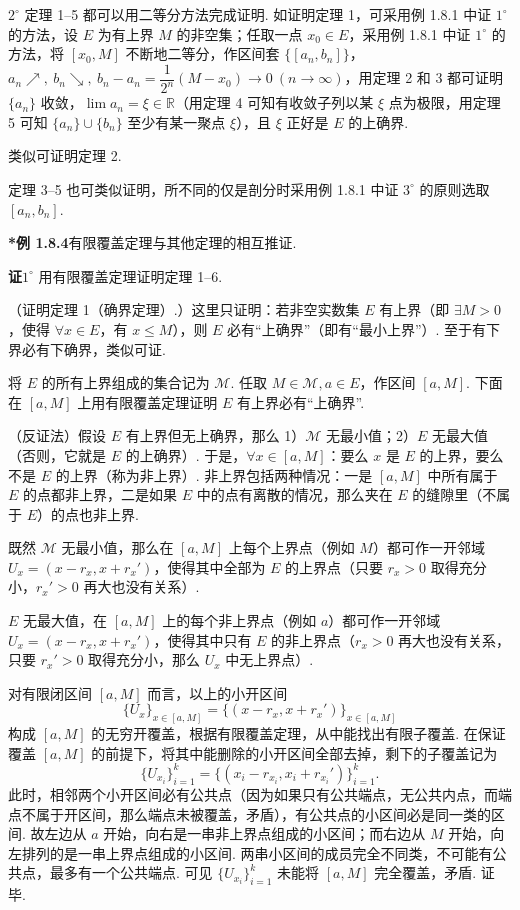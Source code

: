 \documentclass[UTF8, 12pt, fontset=fandol, oneside]{ctexart}
\begin{document}
$2^\circ$ 定理 1--5 都可以用二等分方法完成证明. 如证明定理 1，可采用例 1.8.1 中证 $1^\circ$ 的方法，设 $E$ 为有上界 $M$ 的非空集；任取一点 $x_0\in E$，采用例 1.8.1 中证 $1^\circ$ 的方法，将 $[x_0,M]$ 不断地二等分，作区间套 $\{[a_n,b_n]\}$，$a_n\nearrow,\ b_n\searrow,\ b_n-a_n=\dfrac1{2^n}(M-x_0)\to0\ (n\to\infty)$，用定理 2 和 3 都可证明 $\{a_n\}$ 收敛，$\lim a_n=\xi\in\mathbb{R}$（用定理 4 可知有收敛子列以某 $\xi$ 点为极限，用定理 5 可知 $\{a_n\}\cup\{b_n\}$ 至少有某一聚点 $\xi$），且 $\xi$ 正好是 $E$ 的上确界.

类似可证明定理 2.

定理 3--5 也可类似证明，所不同的仅是剖分时采用例 1.8.1 中证 $3^\circ$ 的原则选取 $[a_n,b_n]$.

\noindent\textbf{*例 1.8.4}\quad 有限覆盖定理与其他定理的相互推证.

\noindent\textbf{证}\quad $1^\circ$ 用有限覆盖定理证明定理 1--6.

（证明定理 1（确界定理）.）这里只证明：若非空实数集 $E$ 有上界（即 $\exists M>0$，使得 $\forall x\in E$，有 $x\le M$），则 $E$ 必有“上确界”（即有“最小上界”）. 至于有下界必有下确界，类似可证.

将 $E$ 的所有上界组成的集合记为 $\mathcal{M}$. 任取 $M\in\mathcal{M},a\in E$，作区间 $[a,M]$. 下面在 $[a,M]$ 上用有限覆盖定理证明 $E$ 有上界必有“上确界”.

（反证法）假设 $E$ 有上界但无上确界，那么 1）$\mathcal{M}$ 无最小值；2）$E$ 无最大值（否则，它就是 $E$ 的上确界）. 于是，$\forall x\in[a,M]$：要么 $x$ 是 $E$ 的上界，要么不是 $E$ 的上界（称为非上界）. 非上界包括两种情况：一是 $[a,M]$ 中所有属于 $E$ 的点都非上界，二是如果 $E$ 中的点有离散的情况，那么夹在 $E$ 的缝隙里（不属于 $E$）的点也非上界.

既然 $\mathcal{M}$ 无最小值，那么在 $[a,M]$ 上每个上界点（例如 $M$）都可作一开邻域 $U_x=(x-r_x,x+r_x')$，使得其中全部为 $E$ 的上界点（只要 $r_x>0$ 取得充分小，$r_x'>0$ 再大也没有关系）.

$E$ 无最大值，在 $[a,M]$ 上的每个非上界点（例如 $a$）都可作一开邻域 $U_x=(x-r_x,x+r_x')$，使得其中只有 $E$ 的非上界点（$r_x>0$ 再大也没有关系，只要 $r_x'>0$ 取得充分小，那么 $U_x$ 中无上界点）.

对有限闭区间 $[a,M]$ 而言，以上的小开区间
\[
  \{U_x\}_{x\in[a,M]}=\{(x-r_x,x+r_x')\}_{x\in[a,M]}
\]
构成 $[a,M]$ 的无穷开覆盖，根据有限覆盖定理，从中能找出有限子覆盖. 在保证覆盖 $[a,M]$ 的前提下，将其中能删除的小开区间全部去掉，剩下的子覆盖记为
\[
  \{U_{x_i}\}_{i=1}^k=\{(x_i-r_{x_i},x_i+r_{x_i}')\}_{i=1}^k.
\]
此时，相邻两个小开区间必有公共点（因为如果只有公共端点，无公共内点，而端点不属于开区间，那么端点未被覆盖，矛盾），有公共点的小区间必是同一类的区间. 故左边从 $a$ 开始，向右是一串非上界点组成的小区间；而右边从 $M$ 开始，向左排列的是一串上界点组成的小区间. 两串小区间的成员完全不同类，不可能有公共点，最多有一个公共端点. 可见 $\{U_{x_i}\}_{i=1}^k$ 未能将 $[a,M]$ 完全覆盖，矛盾. 证毕.
\end{document}
